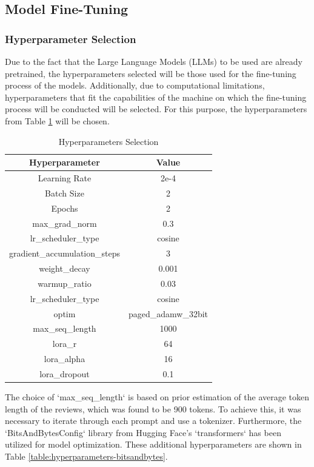\subsection{Model Fine-Tuning}
\subsubsection{Hyperparameter Selection}
Due to the fact that the Large Language Models (LLMs) to be used are already pretrained, the hyperparameters selected will be those used for the fine-tuning process of the models. Additionally, due to computational limitations, hyperparameters that fit the capabilities of the machine on which the fine-tuning process will be conducted will be selected. For this purpose, the hyperparameters from Table \ref{table:hyperparameters} will be chosen.
\begin{table}[H]
    \centering
    \begin{tabular}{|c|c|}
        \hline
        \textbf{Hyperparameter} & \textbf{Value} \\
        \hline
        Learning Rate & 2e-4 \\
        Batch Size & 2 \\
        Epochs & 2 \\
        max\_grad\_norm & 0.3 \\
        lr\_scheduler\_type & cosine\\
        gradient\_accumulation\_steps & 3 \\
        weight\_decay & 0.001 \\
        warmup\_ratio & 0.03 \\
        lr\_scheduler\_type & cosine \\
        optim & paged\_adamw\_32bit \\
        max\_seq\_length & 1000 \\
        lora\_r & 64 \\
        lora\_alpha & 16 \\
        lora\_dropout & 0.1\\
        \hline
    \end{tabular}
    \caption{Hyperparameters Selection}
    \label{table:hyperparameters}
\end{table}
The choice of `max\_seq\_length` is based on prior estimation of the average token length of the reviews, which was found to be 900 tokens. To achieve this, it was necessary to iterate through each prompt and use a tokenizer. Furthermore, the `BitsAndBytesConfig` library from Hugging Face's `transformers` has been utilized for model optimization. These additional hyperparameters are shown in Table \ref{table:hyperparameters-bitsandbytes}.
